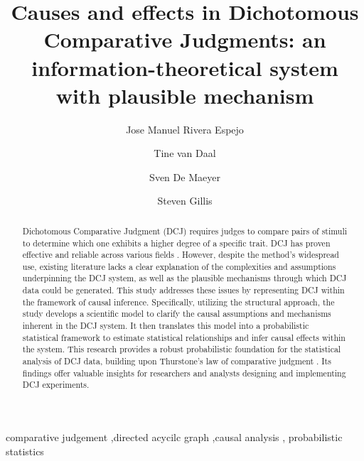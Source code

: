 \documentclass[
  authoryear,
  preprint,
  1p]{elsarticle}
\begin{document}
\begin{frontmatter}
\title{Causes and effects in Dichotomous Comparative Judgments: an
information-theoretical system with plausible mechanism}
\author[1]{Jose Manuel Rivera Espejo%
%
}
\author[1]{Tine van Daal%
%
}
\author[1]{Sven De Maeyer%
%
}
\author[2]{Steven Gillis%
%
}






        
\begin{abstract}
Dichotomous Comparative Judgment (DCJ) requires judges to compare pairs
of stimuli to determine which one exhibits a higher degree of a specific
trait. DCJ has proven effective and reliable across various fields
\citep{Pollitt_2012b, Jones_2015, vanDaal_et_al_2016, Bartholomew_et_al_2018, Lesterhuis_2018, Bartholomew_et_al_2020, Marshall_et_al_2020, Boonen_et_al_2020}.
However, despite the method's widespread use, existing literature lacks
a clear explanation of the complexities and assumptions underpinning the
DCJ system, as well as the plausible mechanisms through which DCJ data
could be generated. This study addresses these issues by representing
DCJ within the framework of causal inference. Specifically, utilizing
the structural approach, the study develops a scientific model to
clarify the causal assumptions and mechanisms inherent in the DCJ
system. It then translates this model into a probabilistic statistical
framework to estimate statistical relationships and infer causal effects
within the system. This research provides a robust probabilistic
foundation for the statistical analysis of DCJ data, building upon
Thurstone's law of comparative judgment \citeyearpar{Thurstone_1927}.
Its findings offer valuable insights for researchers and analysts
designing and implementing DCJ experiments.
\end{abstract}





\begin{keyword}
    comparative judgement \sep directed acycilc graph \sep causal
analysis \sep 
    probabilistic statistics
\end{keyword}
\end{frontmatter}
    
\end{document}
